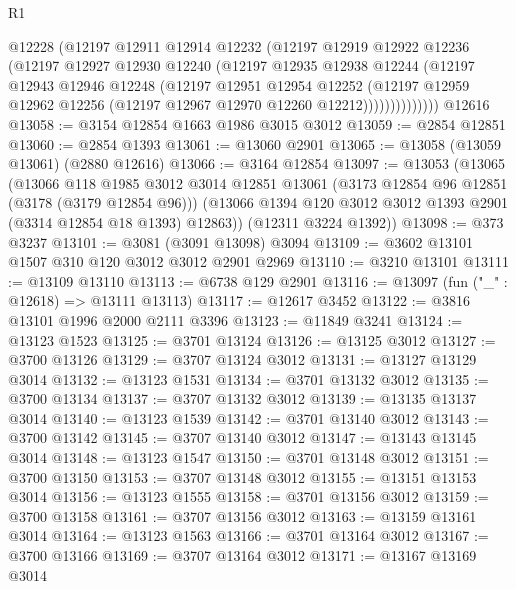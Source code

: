 \begin{lexlean}{R1}
\begin{coremodule}
                @12228
                (@12197
                  @12911
                  @12914
                  @12232
                  (@12197
                    @12919
                    @12922
                    @12236
                    (@12197
                      @12927
                      @12930
                      @12240
                      (@12197
                        @12935
                        @12938
                        @12244
                        (@12197
                          @12943
                          @12946
                          @12248
                          (@12197
                            @12951
                            @12954
                            @12252
                            (@12197
                              @12959
                              @12962
                              @12256
                              (@12197 @12967 @12970 @12260 @12212))))))))))))))
    @12616
@13058 := @3154 @12854 @1663 @1986 @3015 @3012
@13059 := @2854 @12851
@13060 := @2854 @1393
@13061 := @13060 @2901
@13065 := @13058 (@13059 @13061) (@2880 @12616)
@13066 := @3164 @12854
@13097 := @13053
    (@13065
      (@13066
        @118
        @1985
        @3012
        @3014
        @12851
        @13061
        (@3173 @12854 @96 @12851 (@3178 (@3179 @12854 @96)))
        (@13066 @1394 @120 @3012 @3012 @1393 @2901 (@3314 @12854 @18 @1393) @12863))
      (@12311 @3224 @1392))
@13098 := @373 @3237
@13101 := @3081 (@3091 @13098) @3094
@13109 := @3602 @13101 @1507 @310 @120 @3012 @3012 @2901 @2969
@13110 := @3210 @13101
@13111 := @13109 @13110
@13113 := @6738 @129 @2901
@13116 := @13097 (fun ("_" : @12618) => @13111 @13113)
@13117 := @12617 @3452
@13122 := @3816 @13101 @1996 @2000 @2111 @3396
@13123 := @11849 @3241
@13124 := @13123 @1523
@13125 := @3701 @13124
@13126 := @13125 @3012
@13127 := @3700 @13126
@13129 := @3707 @13124 @3012
@13131 := @13127 @13129 @3014
@13132 := @13123 @1531
@13134 := @3701 @13132 @3012
@13135 := @3700 @13134
@13137 := @3707 @13132 @3012
@13139 := @13135 @13137 @3014
@13140 := @13123 @1539
@13142 := @3701 @13140 @3012
@13143 := @3700 @13142
@13145 := @3707 @13140 @3012
@13147 := @13143 @13145 @3014
@13148 := @13123 @1547
@13150 := @3701 @13148 @3012
@13151 := @3700 @13150
@13153 := @3707 @13148 @3012
@13155 := @13151 @13153 @3014
@13156 := @13123 @1555
@13158 := @3701 @13156 @3012
@13159 := @3700 @13158
@13161 := @3707 @13156 @3012
@13163 := @13159 @13161 @3014
@13164 := @13123 @1563
@13166 := @3701 @13164 @3012
@13167 := @3700 @13166
@13169 := @3707 @13164 @3012
@13171 := @13167 @13169 @3014

\end{coremodule}
\end{lexlean}
